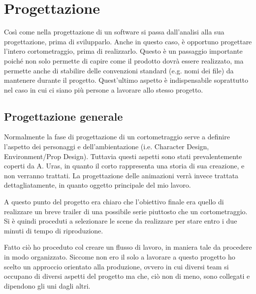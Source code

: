 
\chapter{Progettazione} %

\label{Chapter4} %

Così come nella progettazione di un software si passa dall'analisi alla sua progettazione, prima di svilupparlo. Anche in questo caso, è opportuno progettare l'intero cortometraggio, prima di realizzarlo.
Questo è un passaggio importante poiché non solo permette di capire come il prodotto dovrà essere realizzato, ma permette anche di stabilire delle convenzioni standard (e.g. nomi dei file) da mantenere durante il progetto.
Quest'ultimo aspetto è indispensabile soprattutto nel caso in cui ci siano più persone a lavorare allo stesso progetto.


\section{Progettazione generale}

Normalmente la fase di progettazione di un cortometraggio serve a definire l'aspetto dei personaggi e dell'ambientazione (i.e. Character Design, Environment/Prop Design).
Tuttavia questi aspetti sono stati prevalentemente coperti da A. Uras, in quanto il corto rappresenta una storia di sua creazione, e non verranno trattati. La progettazione delle animazioni verrà invece trattata dettagliatamente, in quanto oggetto principale del mio lavoro.

A questo punto del progetto era chiaro che l'obiettivo finale era quello di realizzare un breve trailer di una possibile serie piuttosto che un cortometraggio.
Si è quindi proceduti a selezionare le scene da realizzare per stare entro i due minuti di tempo di riproduzione.

Fatto ciò ho proceduto col creare un flusso di lavoro, in maniera tale da procedere in modo organizzato.
Siccome non ero il solo a lavorare a questo progetto ho scelto un approccio orientato alla produzione, ovvero in cui diversi team si occupano di diversi aspetti del progetto ma che, ciò non di meno, sono collegati e dipendono gli uni dagli altri.

